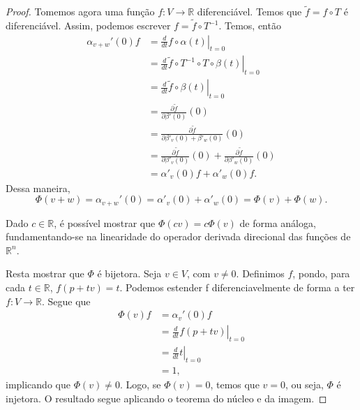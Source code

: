 \begin{lemma}
\begin{proof}
		Tomemos agora uma função $f:V\to \mathbb{R}$ diferenciável. Temos que $\tilde{f}=f \circ T$ é diferenciável. Assim, podemos escrever $f=\tilde{f}\circ T ^{-1}$.
		Temos, então
		\begin{align*}
			\alpha_{v+w}'(0)f & =\left.\frac{d}{dt}f \circ \alpha(t)\right|_{t=0}                                                           \\
			                  & = \left.\frac{d}{dt}\tilde{f} \circ T^{-1} \circ  T \circ \beta(t)\right|_{t=0}                             \\
			                  & = \left.\frac{d}{dt}\tilde{f} \circ \beta(t)\right|_{t=0}                                                   \\
			                  & =\frac{\partial \tilde{f}}{\partial\beta'(0)}(0)\                                                           \\
			                  & =\frac{\partial \tilde{f}}{\partial\beta'_{v}(0)+\beta'_{w}(0)}(0)                                          \\
			                  & = \frac{\partial \tilde{f}}{\partial\beta'_{v}(0)}(0) + \frac{\partial \tilde{f}}{\partial\beta'_{w}(0)}(0) \\
			                  & =\alpha'_{v}(0)f + \alpha'_{w}(0)f.
		\end{align*}
		Dessa maneira,
		\begin{equation*}
			\Phi(v+w)=\alpha_{v+w}'(0)=\alpha'_{v}(0)+\alpha'_{w}(0)=\Phi(v)+\Phi(w).
		\end{equation*}

		Dado $c \in \mathbb{R}$, é possível mostrar que $\Phi(cv)=c\Phi(v)$ de forma análoga, fundamentando-se na linearidade do operador derivada direcional das funções de $\mathbb{R}^{n}$.

		Resta mostrar que $\Phi$ é bijetora. Seja $v \in V$, com $v\neq0$. Definimos $f$, pondo, para cada $t \in \mathbb{R}$, $f(p+tv)=t$. Podemos estender f diferenciavelmente de forma a ter $f:V\to \mathbb{R}$.
		Segue que
		\begin{align*}
			\Phi(v)f & =\alpha_{v}'(0)f                        \\
			         & =\left.\frac{d}{dt}f(p+tv)\right|_{t=0} \\
			         & =\left.\frac{d}{dt}t\right|_{t=0}       \\
			         & =1,
		\end{align*}
		implicando que $\Phi(v)\neq0$.
		Logo, se $\Phi(v)=0$, temos que $v=0$, ou seja, $\Phi$ é injetora. O resultado segue aplicando o teorema do núcleo e da imagem.


\end{proof}
\end{lemma}
